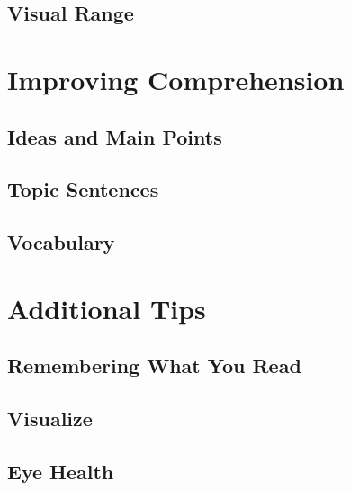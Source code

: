 \documentclass[11pt]{article}
\begin{document}
\subsection{Visual Range}


\section{Improving Comprehension}
\subsection{Ideas and Main Points}
\subsection{Topic Sentences}
\subsection{Vocabulary}

\section{Additional Tips}
\subsection{Remembering What You Read}
\subsection{Visualize}
\subsection{Eye Health}
\newpage


\end{document}
